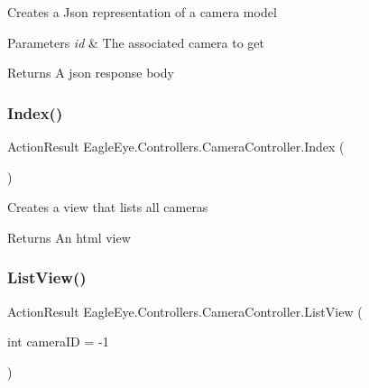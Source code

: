 Creates a Json representation of a camera model 


\begin{DoxyParams}{Parameters}
{\em id} & The associated camera to get\\
\hline
\end{DoxyParams}
\begin{DoxyReturn}{Returns}
A json response body
\end{DoxyReturn}
\mbox{\label{class_eagle_eye_1_1_controllers_1_1_camera_controller_aef90502fd5923368a7ef1773280e4b32}} 
\subsubsection{\texorpdfstring{Index()}{Index()}}
{\footnotesize\ttfamily Action\+Result Eagle\+Eye.\+Controllers.\+Camera\+Controller.\+Index (\begin{DoxyParamCaption}{ }\end{DoxyParamCaption})}



Creates a view that lists all cameras 

\begin{DoxyReturn}{Returns}
An html view
\end{DoxyReturn}
\mbox{\label{class_eagle_eye_1_1_controllers_1_1_camera_controller_a8f80527595c1e7c5e8bec2257ade1b78}} 
\subsubsection{\texorpdfstring{ListView()}{ListView()}}
{\footnotesize\ttfamily Action\+Result Eagle\+Eye.\+Controllers.\+Camera\+Controller.\+List\+View (\begin{DoxyParamCaption}\item[{int}]{camera\+ID = {\ttfamily -\/1} }\end{DoxyParamCaption})}



